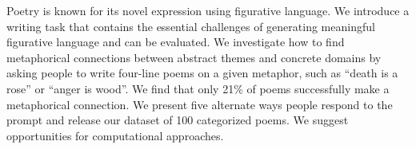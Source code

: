 Poetry is known for its novel expression using figurative language.  We introduce a writing task that contains the essential challenges of generating meaningful figurative language and can be evaluated. We investigate how to find metaphorical connections between abstract themes and concrete domains by asking people to write four-line poems on a given metaphor, such as ``death is a rose'' or ``anger is wood''. We find that only 21\% of poems successfully make a metaphorical connection. We present five alternate ways people respond to the prompt and release our dataset of 100 categorized poems. We suggest opportunities for computational approaches.
